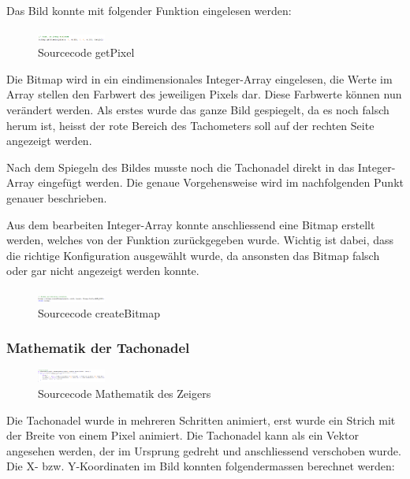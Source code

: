 Das Bild konnte mit folgender Funktion eingelesen werden:

\begin{figure}[ht]
    \includegraphics[width=0.2\textwidth]{3Vorgehen/imag/app_getPixel.png}
    \caption{Sourcecode getPixel}
	\label{app_getPixel} 
\end{figure}

Die Bitmap wird in ein eindimensionales Integer-Array eingelesen, die Werte im Array stellen den Farbwert des jeweiligen Pixels dar. Diese Farbwerte können nun verändert werden. Als erstes wurde das ganze Bild gespiegelt, da es noch falsch herum ist, heisst der rote Bereich des Tachometers soll auf der rechten Seite angezeigt werden.

Nach dem Spiegeln des Bildes musste noch die Tachonadel direkt in das Integer-Array eingefügt werden. Die genaue Vorgehensweise wird im nachfolgenden Punkt genauer beschrieben.

Aus dem bearbeiten Integer-Array konnte anschliessend eine Bitmap erstellt werden, welches von der Funktion zurückgegeben wurde. Wichtig ist dabei, dass die richtige Konfiguration ausgewählt wurde, da ansonsten das Bitmap falsch oder gar nicht angezeigt werden konnte.

\begin{figure}[ht]
    \includegraphics[width=0.2\textwidth]{3Vorgehen/imag/app_createBitmap.png}
    \caption{Sourcecode createBitmap}
	\label{app_createBitmap} 
\end{figure}

\subsubsection{Mathematik der Tachonadel}

\begin{figure}[ht]
    \includegraphics[width=0.2\textwidth]{3Vorgehen/imag/app_drawNeedle.png}
    \caption{Sourcecode Mathematik des Zeigers}
	\label{app_drawNeedle} 
\end{figure}

Die Tachonadel wurde in mehreren Schritten animiert, erst wurde ein Strich mit der Breite von einem Pixel animiert. Die Tachonadel kann als ein Vektor angesehen werden, der im Ursprung gedreht und anschliessend verschoben wurde. Die X- bzw. Y-Koordinaten im Bild konnten folgendermassen berechnet werden:


